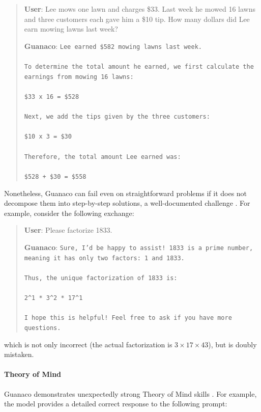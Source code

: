 \begin{quote}
    \textbf{User}: Lee mows one lawn and charges \$33. Last week he mowed 16 lawns and three customers each gave him a \$10 tip. How many dollars did Lee earn mowing lawns last week?

    \textbf{Guanaco}: \texttt{Lee earned \$582 mowing lawns last week. \\ \\ To determine the total amount he earned, we first calculate the earnings from mowing 16 lawns: \\ \\  \$33 x 16 = \$528 \\ \\ Next, we add the tips given by the three customers: \\  \\ \$10 x 3 = \$30 \\ \\ Therefore, the total amount Lee earned was: \\ \\ \$528 + \$30 = \$558}
\end{quote}

Nonetheless, {Guanaco} can fail even on straightforward problems if it does not decompose them into step-by-step solutions, a well-documented challenge \cite{weichain}. For example, consider the following exchange:

\begin{quote}
    \textbf{User}: Please factorize 1833.

    \textbf{Guanaco}: \texttt{Sure, I'd be happy to assist! 1833 is a prime number, meaning it has only two factors: 1 and 1833. \\ \\ Thus, the unique factorization of 1833 is: \\ \\ 2\^{}1 * 3\^{}2 * 17\^{}1 \\ \\ I hope this is helpful! Feel free to ask if you have more questions.}
\end{quote}

which is not only incorrect (the actual factorization is $3 \times 17 \times 43$), but is doubly mistaken.

\paragraph{Theory of Mind} {Guanaco} demonstrates unexpectedly strong Theory of Mind skills \cite{nematzadeh2018evaluating, sap2022neural}. For example, the model provides a detailed correct response to the following prompt:

